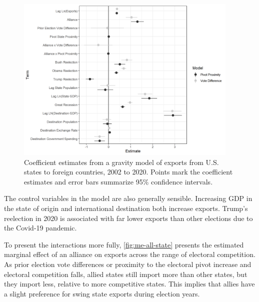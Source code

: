 \documentclass[12pt]{article}
\begin{document}
\begin{figure}[htpb]
	\centering
		\includegraphics[width=0.95\textwidth]{../figures/state-model-coefs.png}
	\caption{Coefficient estimates from a gravity model of exports from U.S. states to foreign countries, 2002 to 2020. Points mark the coefficient estimates and error bars summarize 95\% confidence intervals.}
	\label{fig:state-model-coefs}
\end{figure}


The control variables in the model are also generally sensible. 
Increasing GDP in the state of origin and international destination both increase exports. 
Trump's reelection in 2020 is associated with far lower exports than other elections due to the Covid-19 pandemic. 


To present the interactions more fully, \autoref{fig:me-all-state} presents the estimated marginal effect of an alliance on exports across the range of electoral competition. 
As prior election vote differences or proximity to the electoral pivot increase and electoral competition falls, allied states still import more than other states, but they import less, relative to more competitive states. 
This implies that allies have a slight preference for swing state exports during election years. 
\end{document}
